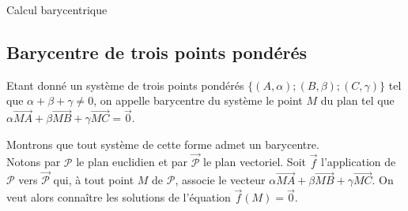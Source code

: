 \begin{chapter}{Calcul barycentrique}
\subsection{Barycentre de trois points pond\'er\'es}
%
\begin{defi}
Etant donn\'e un syst\`eme de trois points pond\'er\'es $\{ (A, \alpha) ; (B, \beta) ; (C, \gamma) \}$ tel que 
$\alpha + \beta + \gamma \neq 0$,
on appelle barycentre du syst\`eme le point $M$ du plan tel que $\alpha \overrightarrow{MA} + \beta \overrightarrow{MB} + \gamma \overrightarrow{MC} = \vec{0}$.
\end{defi}

Montrons que tout syst\`eme de cette forme admet un barycentre. \\
Notons par $\mathcal{P}$ le plan euclidien et par $\overrightarrow{\mathcal{P}}$ le plan vectoriel.
Soit $\vec{f}$ l'application de $\mathcal{P}$ vers $\overrightarrow{\mathcal{P}}$ qui, \`a tout point $M$ de $\mathcal{P}$,
associe le vecteur $\alpha \overrightarrow{MA} + \beta \overrightarrow{MB} + \gamma \overrightarrow{MC}$.
On veut alors conna\^itre les solutions de l'\'equation $\vec{f}(M) = \vec{0}$.


\end{chapter}
